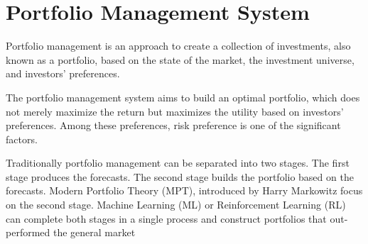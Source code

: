 \section {Portfolio Management System}
Portfolio management is an approach to create a collection of investments, also known as a portfolio, based on the state of the market, the investment universe, and investors' preferences.

The portfolio management system aims to build an optimal portfolio, which does not merely maximize the return but maximizes the utility based on investors' preferences. Among these preferences, risk preference is one of the significant factors.

Traditionally portfolio management can be separated into two stages. The first stage produces the forecasts. The second stage builds the portfolio based on the forecasts.  Modern Portfolio Theory (MPT), introduced by  Harry Markowitz \cite{10.2307/2975974} focus on the second stage. Machine Learning (ML) or Reinforcement Learning (RL) can complete both stages in a single process and construct portfolios that out-performed the general market\cite{KRAUSS2017689, moody2001learning}
